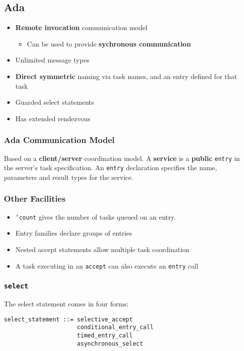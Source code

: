 \documentclass{article}
\begin{document}
\subsection{Ada}
\label{sec:orgc95c3c3}
\begin{itemize}
\item \textbf{Remote invocation} communication model
\begin{itemize}
\item Can be used to provide \textbf{sychronous communication}
\end{itemize}
\item Unlimited message types
\item \textbf{Direct symmetric} naming via task names, and an entry defined for that task
\item Guarded select statements
\item Has extended rendezvous
\end{itemize}

\subsubsection{Ada Communication Model}
\label{sec:org9cc16bd}
Based on a \textbf{client/server} coordination model.
A \textbf{service} is a \textbf{public} \texttt{entry} in the server's task specification.
An \texttt{entry} declaration specifies the name, parameters and result types for the service.

\subsubsection{Other Facilities}
\label{sec:org2a9da9f}
\begin{itemize}
\item \texttt{`count} gives the number of tasks queued on an entry.
\item Entry families declare groups of entries
\item Nested accept statements allow multiple task coordination
\item A task executing in an \texttt{accept} can also execute an \texttt{entry} call
\end{itemize}

\subsubsection{\texttt{select}}
\label{sec:orge9b63ab}
The select statement comes in four forms:
\begin{verbatim}
select_statement ::= selective_accept
                     conditional_entry_call
                     timed_entry_call
                     asynchronous_select
\end{verbatim}
\end{document}

